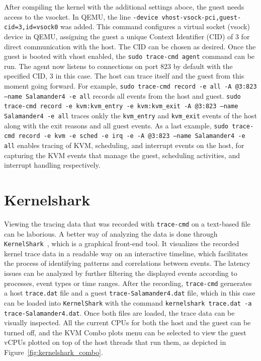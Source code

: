 \documentclass[MMR,Master,english]{twbook}
\begin{document}
\clearpage

\noindent After compiling the kernel with the additional settings aboce, the guest needs access to the vsocket. In QEMU, the line \texttt{-device vhost-vsock-pci,guest-cid=3,id=vsock0} was added. This command configures a virtual socket (vsock) device in QEMU, assigning the guest a unique Context Identifier (CID) of 3 for direct communication with the host. The CID can be chosen as desired. Once the guest is booted with vhost enabled, the \texttt{sudo trace-cmd agent} command can be run.  The agent now listens to connections on port 823 by default with the specified CID, 3 in this case. The host can trace itself and the guest from this moment going forward. For example, \texttt{sudo trace-cmd record -e all -A @3:823 --name Salamander4 -e all} records all events from the host and guest. \texttt{sudo trace-cmd record -e kvm:kvm\_entry -e kvm:kvm\_exit -A @3:823 --name Salamander4 -e all} traces onkly the \texttt{kvm\_entry} and \texttt{kvm\_exit} events of the host along with the exit reasons and all guest events. As a last example, \texttt{sudo trace-cmd record -e kvm -e sched -e irq -e -A @3:823 --name Salamander4 -e all} enables tracing of KVM, scheduling, and interrupt events on the host, for capturing the KVM events that manage the guest, scheduling activities, and interrupt handling respectively.

\section{Kernelshark}\label{sec:kernelshark}
Viewing the tracing data that was recorded with \texttt{trace-cmd} on a text-based file can be laborious. A better way of analyzing the data is done through \texttt{KernelShark}~\cite{KernelShark}, which is a graphical front-end tool. It visualizes the recorded kernel trace data in a readable way on an interactive timeline, which facilitates the process of identifying patterns and correlations between events. The latency issues can be analyzed by further filtering the displayed events according to processes, event types or time ranges. After the recording, \texttt{trace-cmd} gernerates a host \texttt{trace.dat} file and a guest \texttt{trace-Salamander4.dat} file, which in this case can be loaded into \texttt{KernelShark} with the command \texttt{kernelshark trace.dat -a trace-Salamander4.dat}. Once both files are loaded, the trace data can be visually inspected. All the current CPUs for both the host and the guest can be turned off, and the KVM Combo plots menu can be selected to view the guest vCPUs plotted on top of the host threads that run them, as depicted in Figure~\ref{fig:kernelshark_combo}.
\end{document}

